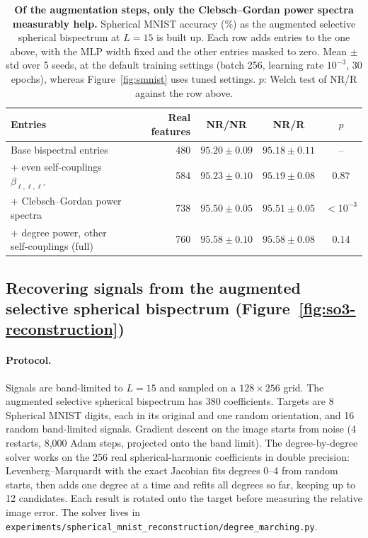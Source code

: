 \documentclass{article}
\theoremstyle{definition}
\theoremstyle{remark}
\theoremstyle{definition}
\begin{document}
\begin{table}[h]
  \centering
  \caption{\textbf{Of the augmentation steps, only the Clebsch--Gordan power spectra measurably
    help.} Spherical MNIST accuracy (\%) as the augmented selective spherical bispectrum at $L{=}15$ is
    built up. Each row adds entries to the one above, with the MLP width fixed and the other
    entries masked to zero. Mean $\pm$ std over 5 seeds, at the default training settings
    (batch 256, learning rate $10^{-3}$, 30 epochs), whereas Figure~\ref{fig:smnist} uses tuned
    settings. $p$: Welch test of NR/R against the row above.}
  \label{tab:smnist-augmentation}
  \small
  \begin{tabular*}{\linewidth}{@{\extracolsep{\fill}}lrccc@{}}
    \toprule
    Entries & Real features & NR/NR & NR/R & $p$ \\
    \midrule
    Base bispectral entries & 480 & $95.20 {\pm} 0.09$ & $95.18 {\pm} 0.11$ & -- \\
    + even self-couplings $\beta_{\ell,\ell,\ell'}$ & 584 & $95.23 {\pm} 0.10$ & $95.19 {\pm} 0.08$ & $0.87$ \\
    + Clebsch--Gordan power spectra & 738 & $95.50 {\pm} 0.05$ & $95.51 {\pm} 0.05$ & $<10^{-3}$ \\
    + degree power, other self-couplings (full) & 760 & $95.58 {\pm} 0.10$ & $95.58 {\pm} 0.08$ & $0.14$ \\
    \bottomrule
  \end{tabular*}
\end{table}

\subsection{Recovering signals from the augmented selective spherical bispectrum
  (Figure~\ref{fig:so3-reconstruction})}
\label{app:so3-recon}

\paragraph{Protocol.} Signals are band-limited to $L{=}15$ and sampled on a
$128{\times}256$ grid. The augmented selective spherical bispectrum has 380 coefficients. Targets are 8 Spherical
MNIST digits, each in its original and one random orientation, and 16 random band-limited
signals. Gradient descent on the image starts from noise (4 restarts, 8{,}000 Adam steps,
projected onto the band limit). The degree-by-degree solver works on the 256 real
spherical-harmonic coefficients in double precision: Levenberg--Marquardt with the exact
Jacobian fits degrees 0--4 from random starts, then adds one degree at a time and refits all
degrees so far, keeping up to 12 candidates. Each result is rotated onto the target before
measuring the relative image error. The solver lives in
\texttt{experiments/spherical\_mnist\_reconstruction/degree\_marching.py}.
\end{document}
